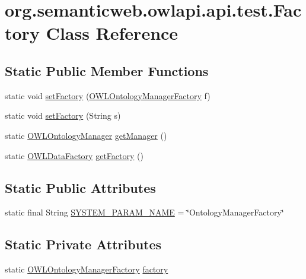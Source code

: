 \hypertarget{classorg_1_1semanticweb_1_1owlapi_1_1api_1_1test_1_1_factory}{\section{org.\-semanticweb.\-owlapi.\-api.\-test.\-Factory Class Reference}
\label{classorg_1_1semanticweb_1_1owlapi_1_1api_1_1test_1_1_factory}
}
\subsection*{Static Public Member Functions}
\begin{DoxyCompactItemize}
\item 
static void \hyperlink{classorg_1_1semanticweb_1_1owlapi_1_1api_1_1test_1_1_factory_a4461fdd49734428aab2cc40cbfb1ef51}{set\-Factory} (\hyperlink{interfaceorg_1_1semanticweb_1_1owlapi_1_1model_1_1_o_w_l_ontology_manager_factory}{O\-W\-L\-Ontology\-Manager\-Factory} f)
\item 
static void \hyperlink{classorg_1_1semanticweb_1_1owlapi_1_1api_1_1test_1_1_factory_a03955cd9687daeb2567e7b85b4f253a4}{set\-Factory} (String s)
\item 
static \hyperlink{interfaceorg_1_1semanticweb_1_1owlapi_1_1model_1_1_o_w_l_ontology_manager}{O\-W\-L\-Ontology\-Manager} \hyperlink{classorg_1_1semanticweb_1_1owlapi_1_1api_1_1test_1_1_factory_ae34504af928105cdfa935e545b3c4ac0}{get\-Manager} ()
\item 
static \hyperlink{interfaceorg_1_1semanticweb_1_1owlapi_1_1model_1_1_o_w_l_data_factory}{O\-W\-L\-Data\-Factory} \hyperlink{classorg_1_1semanticweb_1_1owlapi_1_1api_1_1test_1_1_factory_aa13d980a9c54bf4d951e5d9b117646d6}{get\-Factory} ()
\end{DoxyCompactItemize}
\subsection*{Static Public Attributes}
\begin{DoxyCompactItemize}
\item 
static final String \hyperlink{classorg_1_1semanticweb_1_1owlapi_1_1api_1_1test_1_1_factory_a3f01c4d3b122453cd64dcde9e18c79ec}{S\-Y\-S\-T\-E\-M\-\_\-\-P\-A\-R\-A\-M\-\_\-\-N\-A\-M\-E} = \char`\"{}Ontology\-Manager\-Factory\char`\"{}
\end{DoxyCompactItemize}
\subsection*{Static Private Attributes}
\begin{DoxyCompactItemize}
\item 
static \hyperlink{interfaceorg_1_1semanticweb_1_1owlapi_1_1model_1_1_o_w_l_ontology_manager_factory}{O\-W\-L\-Ontology\-Manager\-Factory} \hyperlink{classorg_1_1semanticweb_1_1owlapi_1_1api_1_1test_1_1_factory_aedb63f4866764127ff8fa465ef1f2477}{factory}
\end{DoxyCompactItemize}


